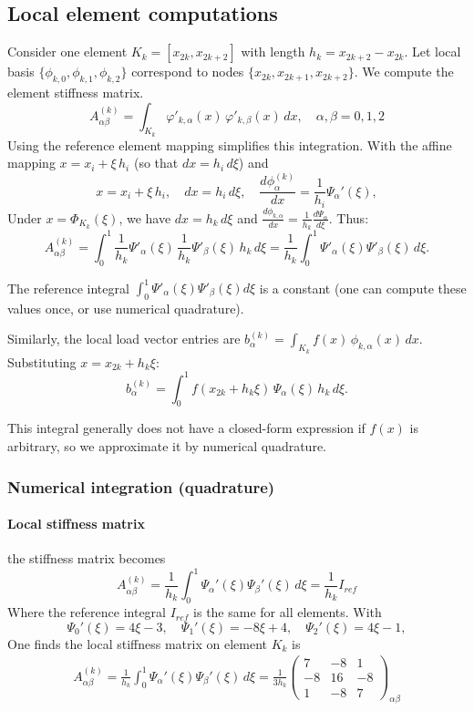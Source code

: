 \documentclass[a4paper,10pt]{article}
\begin{document}
\subsection*{Local element computations}
Consider one element \(K_k = [x_{2k}, x_{2k+2}]\) with length \(h_k = x_{2k+2}-x_{2k}\).
Let local basis \(\{\phi_{k,0},\phi_{k,1},\phi_{k,2}\}\) correspond to nodes \(\{x_{2k}, x_{2k+1}, x_{2k+2}\}\).
We compute the element stiffness matrix.
\[
	A^{(k)}_{\alpha\beta} = \int_{K_k} \varphi'_{k,\alpha}(x)\,\varphi'_{k,\beta}(x)\,dx, \quad \alpha,\beta=0,1,2
\]
Using the reference element mapping simplifies this integration.
With the affine mapping \(x=x_i+\xi\,h_i\) (so that \(dx=h_i\,d\xi\)) and
\[
	x=x_i+\xi\,h_i, \quad dx=h_i\,d\xi, \quad \frac{d\phi_\alpha^{(k)}}{dx}=\frac{1}{h_i}\Psi_\alpha'(\xi),
\]
Under \(x = \Phi_{K_k}(\xi)\), we have \(dx = h_k\,d\xi\) and \(\frac{d\phi_{k,\alpha}}{dx} = \frac{1}{h_k}\frac{d\Psi_\alpha}{d\xi}\).
Thus:
\[
	A^{(k)}_{\alpha\beta}
	= \int_{0}^{1} \frac{1}{h_k}\Psi'_{\alpha}(\xi)\,\frac{1}{h_k}\Psi'_{\beta}(\xi) \,h_k\,d\xi
	= \frac{1}{h_k}\int_{0}^{1} \Psi'_{\alpha}(\xi)\Psi'_{\beta}(\xi)\,d\xi.
\]

The reference integral \(\int_0^1 \Psi'_{\alpha}(\xi)\Psi'_{\beta}(\xi)d\xi\) is a constant (one can compute these values once, or use numerical quadrature).

Similarly, the local load vector entries are \(b^{(k)}_{\alpha} = \int_{K_k} f(x)\,\phi_{k,\alpha}(x)\,dx\).
Substituting \(x = x_{2k}+h_k\xi\):
\[
	b^{(k)}_{\alpha} = \int_{0}^{1} f(x_{2k}+h_k\xi)\,\Psi_{\alpha}(\xi)\,h_k\,d\xi.
\]

This integral generally does not have a closed-form expression if \(f(x)\) is arbitrary, so we approximate it by numerical quadrature.

\subsubsection*{Numerical integration (quadrature)}

\paragraph{Local stiffness matrix}

the stiffness matrix becomes
\[
	A^{(k)}_{\alpha\beta}=\frac{1}{h_k}\int_0^1 \Psi_\alpha'(\xi)\Psi_\beta'(\xi)\,d\xi = \frac{1}{h_k}I_{ref}
\]
Where the reference integral \(I_{ref}\) is the same for all elements.
With
\[
	\Psi_0'(\xi)=4\xi-3,\quad \Psi_1'(\xi)=-8\xi+4,\quad \Psi_2'(\xi)=4\xi-1,
\]
One finds the local stiffness matrix on element \(K_k\) is
\begin{align*}
	A^{(k)}_{\alpha\beta} = \frac{1}{h_k}\int_0^1 \Psi_\alpha'(\xi)\Psi_\beta'(\xi)\,d\xi
	= \frac{1}{3 h_k}
	\begin{pmatrix}
		7  & -8 & 1  \\[1mm]
		-8 & 16 & -8 \\[1mm]
		1  & -8 & 7
	\end{pmatrix}_{\alpha\beta}
\end{align*}
\end{document}
